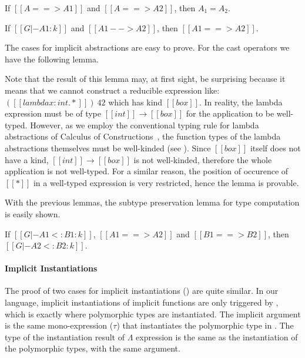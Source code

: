 \begin{lemma}
    If $[[A ==> A1]]$ and $[[A ==> A2]]$,
    then $A_1 = A_2$.
\end{lemma}

\begin{lemma}
    If $[[G |- A1 : k]]$ and $[[A1 --> A2]]$,
    then $[[A1 ==> A2]]$.
\end{lemma}

The cases for implicit abstractions are easy to prove. For the cast operators
we have the following lemma.


Note that the result of this lemma may, at first sight, be surprising
because it means that we cannot construct
a reducible expression like: $([[lambda x : int. *]])~42$ which has kind $[[box]]$.
In reality, the lambda expression must be of type $[[int]] \rightarrow [[box]]$
for the application to be well-typed. However, as we employ the conventional
typing rule for lambda abstractions of Calculus of Constructions~\citep{coc},
the function types of the lambda abstractions themselves
must be well-kinded (see ). Since $[[box]]$ itself does not have a kind,
$[[int]] \rightarrow [[box]]$ is not well-kinded, therefore the whole application
is not well-typed. For a similar reason, the position of occurence of $[[*]]$
in a well-typed expression is very restricted, hence the lemma is provable.

With the previous lemmas, the subtype preservation lemma for type computation is easily shown.

\begin{lemma}
    If $[[G |- A1 <: B1 : k]]$, $[[A1 ==> A2]]$ and $[[B1 ==> B2]]$,
    then $[[G |- A2 <: B2 : k]]$.
\end{lemma}

\paragraph{Implicit Instantiations}
The proof of two cases for implicit instantiations ()
are quite similar. In our language, implicit instantiations of implicit functions
are only triggered by , which is exactly where polymorphic types are instantiated.
The implicit argument is the same mono-expression ($\tau$) that
instantiates the polymorphic type in .
The type of the instantiation result of $\Lambda$ expression is the same as the
instantiation of the polymorphic types, with the same argument.

